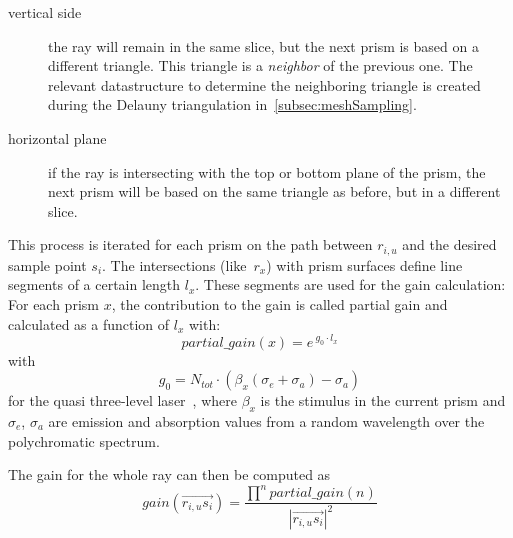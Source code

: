 \begin{description}

  \item[vertical side]
    the ray will remain in the same slice, but the next prism is based on a
    different triangle. This triangle is a \emph{neighbor} of the previous one.
    The relevant datastructure to determine the neighboring triangle is created
    during the Delauny triangulation in~\cref{subsec:meshSampling}.

  \item[horizontal plane]
    if the ray is intersecting with the top or bottom plane of the prism, the
    next prism will be based on the same triangle as before, but in a different
    slice.

\end{description}
This process is iterated for each prism on the path between $r_{i,u}$ and the
desired sample point $s_i$. The intersections (like~$r_x$) with prism surfaces
define line segments of a certain length $l_x$. These segments are used for the
gain calculation: For each prism $x$, the contribution to the gain is called
partial gain and calculated as a function of $l_x$ with:
\begin{equation}
\label{eq:partial_gain}
  partial\_gain(x) = e^{~g_0 \cdot l_x}
\end{equation}
with 
\begin{equation}
\label{eq:gain_local}
  g_0 = N_{tot} \cdot (\beta_x(\sigma_e + \sigma_a) - \sigma_a) 
\end{equation}
for the quasi three-level laser~\cite{Intro4},
where $\beta_x$ is the stimulus in the current
prism and $\sigma_e$, $\sigma_a$ are emission and absorption
values from a random wavelength over the polychromatic spectrum.

The gain for the whole ray can then be computed as
\begin{equation}
\label{eq:gain}
  gain(\overrightarrow{r_{i,u}s_i}) =  
  \frac{\prod^npartial\_gain(n)}{ |\overrightarrow{r_{i,u}s_i}|^2}  
\end{equation}


